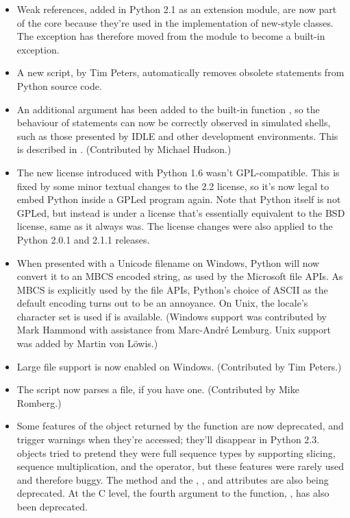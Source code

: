 \documentclass{howto}
\begin{document}
\begin{itemize}
  \item Weak references, added in Python 2.1 as an extension module,
  are now part of the core because they're used in the implementation
  of new-style classes.  The  exception has
  therefore moved from the  module to become a
  built-in exception.

  \item A new script,  by Tim
  Peters, automatically removes obsolete  statements
  from Python source code.

  \item An additional  argument has been added to the
  built-in function , so the behaviour of
   statements can now be correctly observed in
  simulated shells, such as those presented by IDLE and other
  development environments.  This is described in .
  (Contributed by Michael Hudson.)

  \item The new license introduced with Python 1.6 wasn't
  GPL-compatible.  This is fixed by some minor textual changes to the
  2.2 license, so it's now legal to embed Python inside a GPLed
  program again.  Note that Python itself is not GPLed, but instead is
  under a license that's essentially equivalent to the BSD license,
  same as it always was.  The license changes were also applied to the
  Python 2.0.1 and 2.1.1 releases.

  \item When presented with a Unicode filename on Windows, Python will
  now convert it to an MBCS encoded string, as used by the Microsoft
  file APIs.  As MBCS is explicitly used by the file APIs, Python's
  choice of ASCII as the default encoding turns out to be an
  annoyance.  On Unix, the locale's character set is used if
   is available.  (Windows
  support was contributed by Mark Hammond with assistance from
  Marc-Andr\'e Lemburg. Unix support was added by Martin von L\"owis.)

  \item Large file support is now enabled on Windows.  (Contributed by
  Tim Peters.)

  \item The  script
  now parses a  file, if you have one.
  (Contributed by Mike Romberg.) 

  \item Some features of the object returned by the
   function are now deprecated, and trigger
  warnings when they're accessed; they'll disappear in Python 2.3.
   objects tried to pretend they were full sequence
  types by supporting slicing, sequence multiplication, and the
   operator, but these features were rarely used and
  therefore buggy.  The  method and the
  , , and  attributes are also
  being deprecated.  At the C level, the fourth argument to the
   function, , has also been
  deprecated.


\end{itemize}
\end{document}
